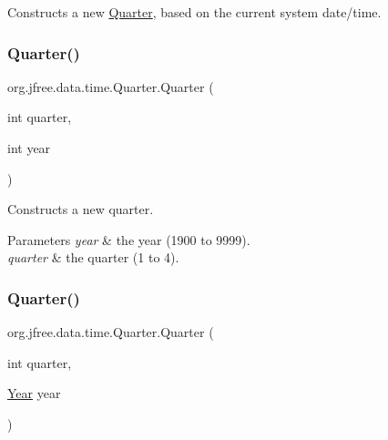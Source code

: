 Constructs a new \mbox{\hyperlink{classorg_1_1jfree_1_1data_1_1time_1_1_quarter}{Quarter}}, based on the current system date/time. \mbox{\label{classorg_1_1jfree_1_1data_1_1time_1_1_quarter_ad1982d6803ea5cc139edb9f34b1cb58f}} 
\subsubsection{\texorpdfstring{Quarter()}{Quarter()}\hspace{0.1cm}{\footnotesize\ttfamily [2/6]}}
{\footnotesize\ttfamily org.\+jfree.\+data.\+time.\+Quarter.\+Quarter (\begin{DoxyParamCaption}\item[{int}]{quarter,  }\item[{int}]{year }\end{DoxyParamCaption})}

Constructs a new quarter.


\begin{DoxyParams}{Parameters}
{\em year} & the year (1900 to 9999). \\
\hline
{\em quarter} & the quarter (1 to 4). \\
\hline
\end{DoxyParams}
\mbox{\label{classorg_1_1jfree_1_1data_1_1time_1_1_quarter_a4c9303ece8b128e07d02e90a79c01c55}} 
\subsubsection{\texorpdfstring{Quarter()}{Quarter()}\hspace{0.1cm}{\footnotesize\ttfamily [3/6]}}
{\footnotesize\ttfamily org.\+jfree.\+data.\+time.\+Quarter.\+Quarter (\begin{DoxyParamCaption}\item[{int}]{quarter,  }\item[{\mbox{\hyperlink{classorg_1_1jfree_1_1data_1_1time_1_1_year}{Year}}}]{year }\end{DoxyParamCaption})}

